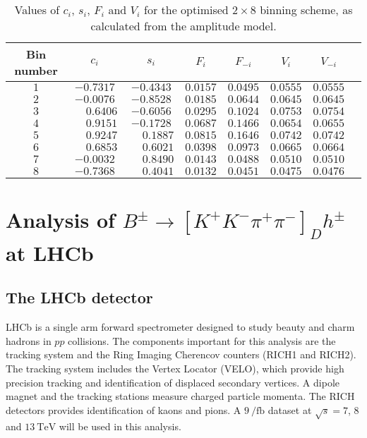 \documentclass[12pt, a4paper, notitlepage, onecolumn]{article}
\begin{document}
\begin{table}[tb]
    \centering
    \caption{Values of $c_i$, $s_i$, $F_i$ and $V_i$ for the optimised $2\times 8$ binning scheme, as calculated from the amplitude model.  }
    \label{table:ci_si_Fi_2x8}
    \begin{tabular}{cccccccc}
        \toprule
        Bin number& $c_i$     & $s_i$     & $F_i$     & $F_{-i}$  & $V_i$     & $V_{-i}$ \\
        \midrule
        $1$       & $-0.7317$ & $-0.4343$ & $0.0157$  & $0.0495$  & $0.0555$  & $0.0555$   \\
        $2$       & $-0.0076$ & $-0.8528$ & $0.0185$  & $0.0644$  & $0.0645$  & $0.0645$   \\
        $3$       & $\phantom{-}0.6406$  & $-0.6056$ & $0.0295$  & $0.1024$  & $0.0753$  & $0.0754$   \\
        $4$       & $\phantom{-}0.9151$  & $-0.1728$ & $0.0687$  & $0.1466$  & $0.0654$  & $0.0655$   \\
        $5$       & $\phantom{-}0.9247$  & $\phantom{-}0.1887$  & $0.0815$  & $0.1646$  & $0.0742$  & $0.0742$   \\
        $6$       & $\phantom{-}0.6853$  & $\phantom{-}0.6021$  & $0.0398$  & $0.0973$  & $0.0665$  & $0.0664$   \\
        $7$       & $-0.0032$ & $\phantom{-}0.8490$  & $0.0143$  & $0.0488$  & $0.0510$  & $0.0510$   \\
        $8$       & $-0.7368$ & $\phantom{-}0.4041$  & $0.0132$  & $0.0451$  & $0.0475$  & $0.0476$   \\
        \bottomrule
    \end{tabular}
\end{table}

\section{Analysis of \texorpdfstring{$B^\pm\to[K^+K^-\pi^+\pi^-]_Dh^\pm$}{B2DhD2KKpipi} at LHCb}
\subsection{The LHCb detector}
\noindent LHCb \cite{cite_LHCb} is a single arm forward spectrometer designed to study beauty and charm hadrons in $pp$ collisions. The components important for this analysis are the tracking system and the Ring Imaging Cherencov counters (RICH1 and RICH2). The tracking system includes the Vertex Locator (VELO), which provide high precision tracking and identification of displaced secondary vertices. A dipole magnet and the tracking stations measure charged particle momenta. The RICH detectors provides identification of kaons and pions. A $\SI{9}{\per\femto\barn}$ dataset at $\sqrt{s} = 7$, $8$ and $\SI{13}{\tera\eV}$ will be used in this analysis.
\end{document}
